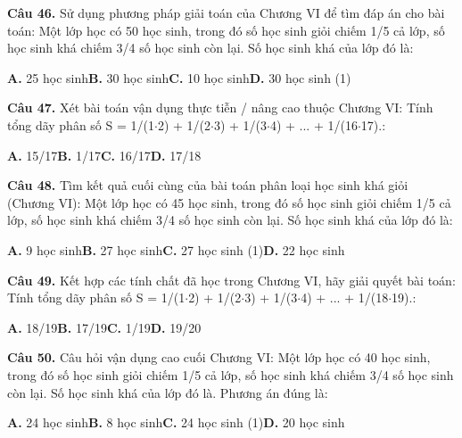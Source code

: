 \documentclass[11pt,a4paper]{article}
\begin{document}
\textbf{\color{primary} Câu 46.} Sử dụng phương pháp giải toán của Chương VI để tìm đáp án cho bài toán: Một lớp học có 50 học sinh, trong đó số học sinh giỏi chiếm 1/5 cả lớp, số học sinh khá chiếm 3/4 số học sinh còn lại. Số học sinh khá của lớp đó là:\par
\hspace*{1.5em}\textbf{A.} 25 học sinh\quad\quad \textbf{B.} 30 học sinh\quad\quad \textbf{C.} 10 học sinh\quad\quad \textbf{D.} 30 học sinh (1)\par\vspace{2pt}
\textbf{\color{primary} Câu 47.} Xét bài toán vận dụng thực tiễn / nâng cao thuộc Chương VI: Tính tổng dãy phân số S = 1/(1$\cdot$2) + 1/(2$\cdot$3) + 1/(3$\cdot$4) + ... + 1/(16$\cdot$17).:\par
\hspace*{1.5em}\textbf{A.} 15/17\quad\quad \textbf{B.} 1/17\quad\quad \textbf{C.} 16/17\quad\quad \textbf{D.} 17/18\par\vspace{2pt}
\textbf{\color{primary} Câu 48.} Tìm kết quả cuối cùng của bài toán phân loại học sinh khá giỏi (Chương VI): Một lớp học có 45 học sinh, trong đó số học sinh giỏi chiếm 1/5 cả lớp, số học sinh khá chiếm 3/4 số học sinh còn lại. Số học sinh khá của lớp đó là:\par
\hspace*{1.5em}\textbf{A.} 9 học sinh\quad\quad \textbf{B.} 27 học sinh\quad\quad \textbf{C.} 27 học sinh (1)\quad\quad \textbf{D.} 22 học sinh\par\vspace{2pt}
\textbf{\color{primary} Câu 49.} Kết hợp các tính chất đã học trong Chương VI, hãy giải quyết bài toán: Tính tổng dãy phân số S = 1/(1$\cdot$2) + 1/(2$\cdot$3) + 1/(3$\cdot$4) + ... + 1/(18$\cdot$19).:\par
\hspace*{1.5em}\textbf{A.} 18/19\quad\quad \textbf{B.} 17/19\quad\quad \textbf{C.} 1/19\quad\quad \textbf{D.} 19/20\par\vspace{2pt}
\textbf{\color{primary} Câu 50.} Câu hỏi vận dụng cao cuối Chương VI: Một lớp học có 40 học sinh, trong đó số học sinh giỏi chiếm 1/5 cả lớp, số học sinh khá chiếm 3/4 số học sinh còn lại. Số học sinh khá của lớp đó là. Phương án đúng là:\par
\hspace*{1.5em}\textbf{A.} 24 học sinh\quad\quad \textbf{B.} 8 học sinh\quad\quad \textbf{C.} 24 học sinh (1)\quad\quad \textbf{D.} 20 học sinh\par\vspace{2pt}
\end{document}
